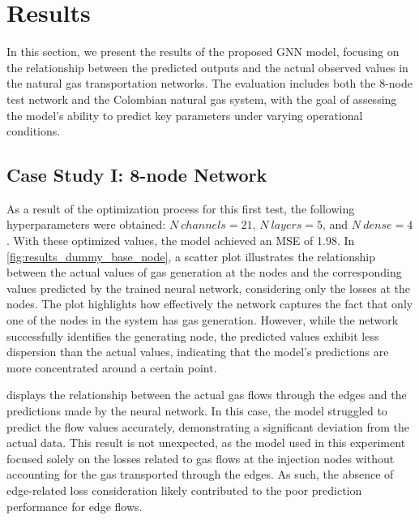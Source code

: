 \section{Results}

In this section, we present the results of the proposed GNN model, focusing on the relationship between the predicted outputs and the actual observed values in the natural gas transportation networks. The evaluation includes both the 8-node test network and the Colombian natural gas system, with the goal of assessing the model's ability to predict key parameters under varying operational conditions. 


%
%     
%

\subsection{Case Study I: 8-node Network}


As a result of the optimization process for this first test, the following hyperparameters were obtained: $N \ channels=21$, $N \ layers=5$, and $N \ dense=4$. With these optimized values, the model achieved an MSE of 1.98. In \cref{fig:results_dummy_base_node}, a scatter plot illustrates the relationship between the actual values of gas generation at the nodes and the corresponding values predicted by the trained neural network, considering only the losses at the nodes. The plot highlights how effectively the network captures the fact that only one of the nodes in the system has gas generation. However, while the network successfully identifies the generating node, the predicted values exhibit less dispersion than the actual values, indicating that the model's predictions are more concentrated around a certain point.


 displays the relationship between the actual gas flows through the edges and the predictions made by the neural network. In this case, the model struggled to predict the flow values accurately, demonstrating a significant deviation from the actual data. This result is not unexpected, as the model used in this experiment focused solely on the losses related to gas flows at the injection nodes without accounting for the gas transported through the edges. As such, the absence of edge-related loss consideration likely contributed to the poor prediction performance for edge flows.


